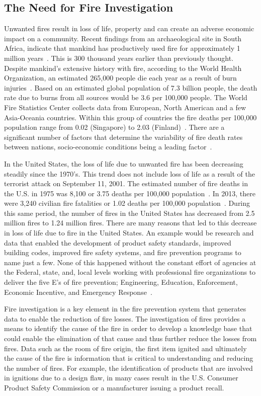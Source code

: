 \documentclass[twoside]{uocthesis}
\begin{document}
\subsection{The Need for Fire Investigation}
Unwanted fires result in loss of life, property and can create an adverse economic impact on a community.  Recent findings from an archaeological site in South Africa, indicate that mankind has productively used fire for approximately 1 million years~\cite{Berna:2012}.  This is 300 thousand years earlier than previously thought.  Despite mankind's extensive history with fire, according to the World Health Organization, an estimated 265,000 people die each year as a result of burn injuries~\cite{WHO:2014}.  Based on an estimated global population of 7.3 billion people, the death rate due to burns from all sources would be 3.6 per 100,000 people.  The World Fire Statistics Center collects data from European, North American and a few Asia-Oceania countries.  Within this group of countries the fire deaths per 100,000 population range from 0.02 (Singapore) to 2.03 (Finland)~\cite{Climate:2014}. There are a significant number of factors that determine the variability of fire death rates between nations, socio-economic conditions being a leading factor~\cite{WHO:2014}.

In the United States, the loss of life due to unwanted fire has been decreasing steadily since the 1970’s.  This trend does not include loss of life as a result of the terrorist attack on September 11, 2001.  The estimated number of fire deaths in the U.S. in 1975 was 8,100 or 3.75 deaths per 100,000 population~\cite{America_Burning_Revisited}.  In 2013, there were 3,240 civilian fire fatalities or 1.02 deaths per 100,000 population~\cite{Karter:2014}.  During this same period, the number of fires in the United States has decreased from 2.5 million fires to 1.24 million fires.  There are many reasons that led to this decrease in loss of life due to fire in the United States.  An example would be research and data that enabled the development of product safety standards, improved building codes, improved fire safety systems, and fire prevention programs to name just a few.  None of this happened without the constant effort of agencies at the Federal, state, and, local levels working with professional fire organizations to deliver the five E’s of fire prevention; Engineering, Education, Enforcement, Economic Incentive, and Emergency Response~\cite{FEMA:2013}.

Fire investigation is a key element in the fire prevention system that generates data to enable the reduction of fire losses.  The investigation of fires provides a means to identify the cause of the fire in order to develop a knowledge base that could enable the elimination of that cause and thus further reduce the losses from fires.  Data such as the room of fire origin, the first item ignited and ultimately the cause of the fire is information that is critical to understanding and reducing the number of fires.  For example, the identification of products that are involved in ignitions due to a design flaw, in many cases result in the U.S. Consumer Product Safety Commission or a manufacturer issuing a product recall.
\end{document}
